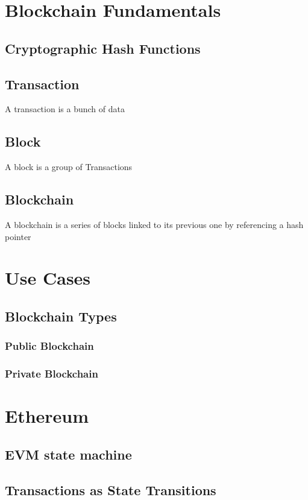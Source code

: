 \section{Blockchain Fundamentals}
\subsection{Cryptographic Hash Functions}
\subsection{Transaction}
A transaction is a bunch of data 
\subsection{Block}
A block is a group of Transactions
\subsection{Blockchain}
A blockchain is a series of blocks linked to its previous one by referencing a hash pointer 

\section{Use Cases}

\subsection{Blockchain Types}
\subsubsection{Public Blockchain}
\subsubsection{Private Blockchain}


\section{Ethereum}

\subsection{EVM state machine}

\subsection{Transactions as State Transitions}

